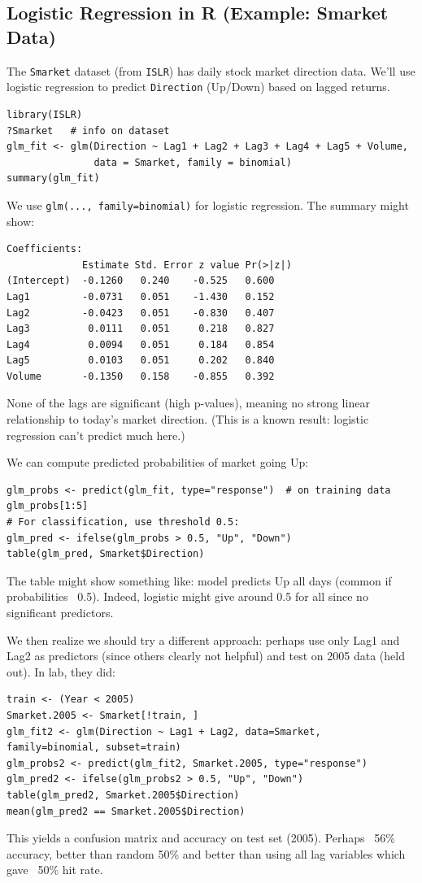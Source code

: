 \documentclass[11pt]{article}
\begin{document}
\subsection{Logistic Regression in R (Example: Smarket Data)}
The \texttt{Smarket} dataset (from \texttt{ISLR}) has daily stock market direction data. We'll use logistic regression to predict \texttt{Direction} (Up/Down) based on lagged returns.

\begin{verbatim}
library(ISLR)
?Smarket   # info on dataset
glm_fit <- glm(Direction ~ Lag1 + Lag2 + Lag3 + Lag4 + Lag5 + Volume,
               data = Smarket, family = binomial)
summary(glm_fit)
\end{verbatim}
We use \texttt{glm(..., family=binomial)} for logistic regression. The summary might show:
\begin{verbatim}
Coefficients:
             Estimate Std. Error z value Pr(>|z|)
(Intercept)  -0.1260   0.240    -0.525   0.600
Lag1         -0.0731   0.051    -1.430   0.152
Lag2         -0.0423   0.051    -0.830   0.407
Lag3          0.0111   0.051     0.218   0.827
Lag4          0.0094   0.051     0.184   0.854
Lag5          0.0103   0.051     0.202   0.840
Volume       -0.1350   0.158    -0.855   0.392
\end{verbatim}
None of the lags are significant (high p-values), meaning no strong linear relationship to today's market direction. (This is a known result: logistic regression can't predict much here.)

We can compute predicted probabilities of market going Up:
\begin{verbatim}
glm_probs <- predict(glm_fit, type="response")  # on training data
glm_probs[1:5]
# For classification, use threshold 0.5:
glm_pred <- ifelse(glm_probs > 0.5, "Up", "Down")
table(glm_pred, Smarket$Direction)
\end{verbatim}
The table might show something like: model predicts Up all days (common if probabilities ~0.5). Indeed, logistic might give around 0.5 for all since no significant predictors.

We then realize we should try a different approach: perhaps use only Lag1 and Lag2 as predictors (since others clearly not helpful) and test on 2005 data (held out). In lab, they did:
\begin{verbatim}
train <- (Year < 2005)
Smarket.2005 <- Smarket[!train, ]
glm_fit2 <- glm(Direction ~ Lag1 + Lag2, data=Smarket, family=binomial, subset=train)
glm_probs2 <- predict(glm_fit2, Smarket.2005, type="response")
glm_pred2 <- ifelse(glm_probs2 > 0.5, "Up", "Down")
table(glm_pred2, Smarket.2005$Direction)
mean(glm_pred2 == Smarket.2005$Direction)
\end{verbatim}
This yields a confusion matrix and accuracy on test set (2005). Perhaps ~56\% accuracy, better than random 50\% and better than using all lag variables which gave ~50\% hit rate.
\end{document}
